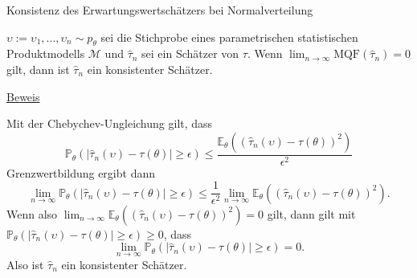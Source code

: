 \documentclass[
  8pt,
  ignorenonframetext,
]{beamer}
\newcommand{\ups} {\upsilon}
\begin{document}
\begin{frame}{Konsistenz des Erwartungswertschätzers bei
Normalverteilung}
\protect\hypertarget{konsistenz-des-erwartungswertschuxe4tzers-bei-normalverteilung}{}
\small
\begin{theorem}
\normalfont
\justifying
$\ups := \ups_1,...,\ups_n \sim p_\theta$ sei die Stichprobe eines parametrischen statistischen
Produktmodells $\mathcal{M}$ und $\hat{\tau}_n$ sei ein Schätzer von $\tau$. Wenn
$\lim_{n\to \infty} \mbox{MQF}(\hat{\tau}_n) = 0$ gilt, dann ist $\hat{\tau}_n$
ein konsistenter Schätzer.
\end{theorem}

\footnotesize

\underline{Beweis}

Mit der Chebychev-Ungleichung gilt, dass \begin{equation}
\mathbb{P}_\theta\left(|\hat{\tau}_n(\ups) - \tau(\theta)| \ge \epsilon \right) \le
\frac{\mathbb{E}_\theta\left((\hat{\tau}_n(\ups) -  \tau(\theta))^2\right)}{\epsilon^2}
\end{equation} Grenzwertbildung ergibt dann \begin{equation}
\lim_{n\to \infty}\mathbb{P}_\theta\left(|\hat{\tau}_n(\ups) - \tau(\theta)| \ge \epsilon \right) \le
\frac{1}{\epsilon^2}\lim_{n\to\infty}\mathbb{E}_\theta\left((\hat{\tau}_n(\ups) - \tau(\theta))^2\right).
\end{equation} Wenn also
\(\lim_{n\to\infty}\mathbb{E}_\theta\left((\hat{\tau}_n(\ups) - \tau(\theta))^2\right) = 0\)
gilt, dann gilt mit
\(\mathbb{P}_\theta(|\hat{\tau}_n(\ups) - \tau(\theta)| \ge \epsilon)\ge 0\),
dass \begin{equation}
\lim_{n\to \infty}\mathbb{P}_\theta\left(|\hat{\tau}_n(\ups) - \tau(\theta)| \ge \epsilon \right) = 0.
\end{equation} Also ist \(\hat{\tau}_n\) ein konsistenter Schätzer.
\end{frame}
\end{document}
